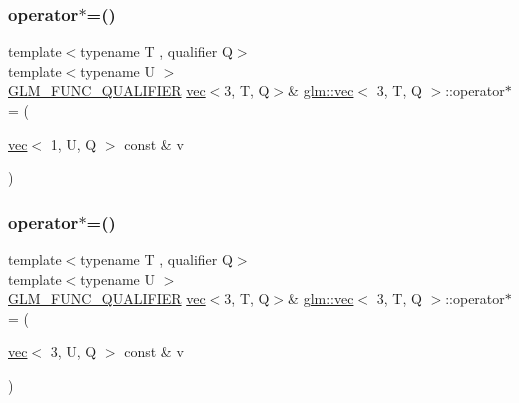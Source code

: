 \mbox{\label{structglm_1_1vec_3_013_00_01_t_00_01_q_01_4_abf00e0a1c52a2ea28c89b50edec4b722}} 
\subsubsection{\texorpdfstring{operator$\ast$=()}{operator*=()}\hspace{0.1cm}{\footnotesize\ttfamily [5/6]}}
{\footnotesize\ttfamily template$<$typename T , qualifier Q$>$ \\
template$<$typename U $>$ \\
\hyperlink{setup_8hpp_a33fdea6f91c5f834105f7415e2a64407}{G\+L\+M\+\_\+\+F\+U\+N\+C\+\_\+\+Q\+U\+A\+L\+I\+F\+I\+ER} \hyperlink{structglm_1_1vec}{vec}$<$3, T, Q$>$\& \hyperlink{structglm_1_1vec}{glm\+::vec}$<$ 3, T, Q $>$\+::operator$\ast$= (\begin{DoxyParamCaption}\item[{\hyperlink{structglm_1_1vec}{vec}$<$ 1, U, Q $>$ const \&}]{v }\end{DoxyParamCaption})}

\mbox{\label{structglm_1_1vec_3_013_00_01_t_00_01_q_01_4_a20170b8b71ce0a479ea43b5d4690a1a5}} 
\subsubsection{\texorpdfstring{operator$\ast$=()}{operator*=()}\hspace{0.1cm}{\footnotesize\ttfamily [6/6]}}
{\footnotesize\ttfamily template$<$typename T , qualifier Q$>$ \\
template$<$typename U $>$ \\
\hyperlink{setup_8hpp_a33fdea6f91c5f834105f7415e2a64407}{G\+L\+M\+\_\+\+F\+U\+N\+C\+\_\+\+Q\+U\+A\+L\+I\+F\+I\+ER} \hyperlink{structglm_1_1vec}{vec}$<$3, T, Q$>$\& \hyperlink{structglm_1_1vec}{glm\+::vec}$<$ 3, T, Q $>$\+::operator$\ast$= (\begin{DoxyParamCaption}\item[{\hyperlink{structglm_1_1vec}{vec}$<$ 3, U, Q $>$ const \&}]{v }\end{DoxyParamCaption})}

